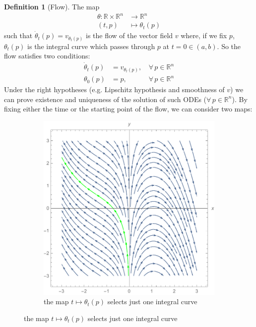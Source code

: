 \documentclass[a4paper,11pt,titlepage, article, oneside]{memoir}
\numberwithin{equation}{section}
\theoremstyle{definition}
\newtheorem{definition}[theorem]{Definition}
\theoremstyle{remark}
\newcommand{\rfield}{\mathbb{R}}
\begin{document}
\begin{definition}[Flow]
  The map
  \begin{align}
    \theta \colon \rfield \times \rfield^n &\rightarrow \rfield^n \\
    (t, p) &\mapsto \theta_t(p) \nonumber
  \end{align}
  such that $\dot\theta_t(p) = v_{\theta_t(p)}$ is the flow of the vector field $v$ where, if we fix $p$, $\theta_t(p)$ is the integral curve which passes through $p$ at $t=0 \in (a, b)$.
  So the flow satisfies two conditions:
  \begin{align}
    \dot\theta_t(p) &= v_{\theta_t(p)} , \, &\forall \, p \in \rfield^n \\
    \theta_0(p) &= p, \, &\forall \, p \in \rfield^n
  \end{align}
Under the right hypotheses (e.g. Lipschitz hypothesis and smoothness of $v$) we can prove existence and uniqueness of the solution of such ODEs ($\forall\, p \in \rfield^n$).
By fixing either the time or the starting point of the flow, we can consider two maps:
\begin{figure}[H]
\centering
\begin{subfigure}{.45\textwidth}
     \centering
     \includegraphics[width=\linewidth]{Images/integralcurve_1.pdf}
     \caption{the map $t \mapsto \theta_t(p)$ selects just one integral curve} \label{Fig:integralcurve_1}

\end{subfigure}
\end{figure}
\end{definition}
\end{document}
